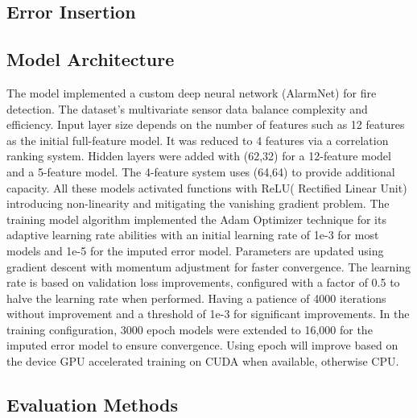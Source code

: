 \documentclass[conference]{IEEEtran}
\begin{document}
\subsection{Error Insertion}

\subsection{Model Architecture}
The model implemented a custom deep neural network
(AlarmNet) for fire detection. The dataset's multivariate
sensor data balance complexity and efficiency. Input layer
size depends on the number of features such as 12 features
as the initial full-feature model. It was reduced to 4
features via a correlation ranking system. Hidden layers
were added with (62,32) for a 12-feature model and a
5-feature model. The 4-feature system uses (64,64) to
provide additional capacity. All these models activated
functions with ReLU( Rectified Linear Unit) introducing
non-linearity and mitigating the vanishing gradient problem.
The training model algorithm implemented the Adam Optimizer
technique for its adaptive learning rate abilities with an
initial learning rate of 1e-3 for most models and 1e-5 for
the imputed error model. Parameters are updated using
gradient descent with momentum adjustment for faster
convergence. The learning rate is based on validation loss
improvements, configured with a factor of 0.5 to halve the
learning rate when performed. Having a patience of 4000
iterations without improvement and a threshold of 1e-3 for
significant improvements. In the training configuration,
3000 epoch models were extended to 16,000 for the imputed
error model to ensure convergence. Using epoch will improve
based on the device GPU accelerated training on CUDA when
available, otherwise CPU. 




\subsection{Evaluation Methods}
\end{document}
